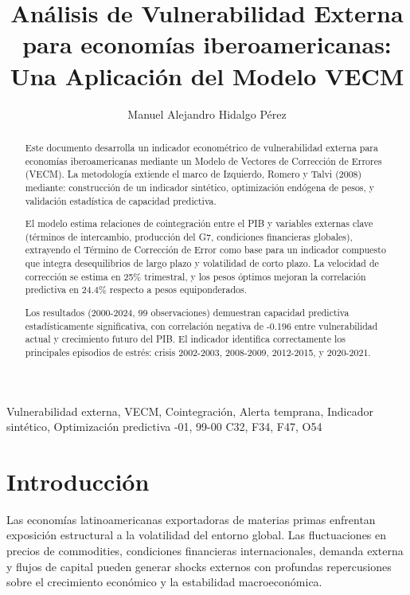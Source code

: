 \documentclass[3p,11pt]{elsarticle}
\begin{document}
\begin{frontmatter}

\title{Análisis de Vulnerabilidad Externa para economías iberoamericanas: Una Aplicación del Modelo VECM}

\author[inst1]{Manuel Alejandro Hidalgo Pérez}
\address[inst1]{Departamento de Economía, Universidad Pablo de Olavide, Sevilla, España}

\begin{abstract}
Este documento desarrolla un indicador econométrico de vulnerabilidad externa para economías iberoamericanas mediante un Modelo de Vectores de Corrección de Errores (VECM). La metodología extiende el marco de Izquierdo, Romero y Talvi (2008) mediante: construcción de un indicador sintético, optimización endógena de pesos, y validación estadística de capacidad predictiva.

El modelo estima relaciones de cointegración entre el PIB y variables externas clave (términos de intercambio, producción del G7, condiciones financieras globales), extrayendo el Término de Corrección de Error como base para un indicador compuesto que integra desequilibrios de largo plazo y volatilidad de corto plazo. La velocidad de corrección se estima en 25\% trimestral, y los pesos óptimos mejoran la correlación predictiva en 24.4\% respecto a pesos equiponderados.

Los resultados (2000-2024, 99 observaciones) demuestran capacidad predictiva estadísticamente significativa, con correlación negativa de -0.196 entre vulnerabilidad actual y crecimiento futuro del PIB. El indicador identifica correctamente los principales episodios de estrés: crisis 2002-2003, 2008-2009, 2012-2015, y 2020-2021.
\end{abstract}

\begin{keyword}
Vulnerabilidad externa, VECM, Cointegración, Alerta temprana, Indicador sintético, Optimización predictiva
-01, 99-00
\JEL  C32, F34, F47, O54
\end{keyword}

\end{frontmatter}

\section{Introducción}

Las economías latinoamericanas exportadoras de materias primas enfrentan exposición estructural a la volatilidad del entorno global. Las fluctuaciones en precios de commodities, condiciones financieras internacionales, demanda externa y flujos de capital pueden generar shocks externos con profundas repercusiones sobre el crecimiento económico y la estabilidad macroeconómica.
\end{document}
